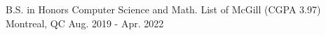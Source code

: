 

\begin{cventries}

  \cventry
  {B.S. in Honors Computer Science and Math. List of } %
  {McGill (CGPA 3.97)} %
    {Montreal, QC} %
    {Aug. 2019 - Apr. 2022} %
    {
    }

\end{cventries}

